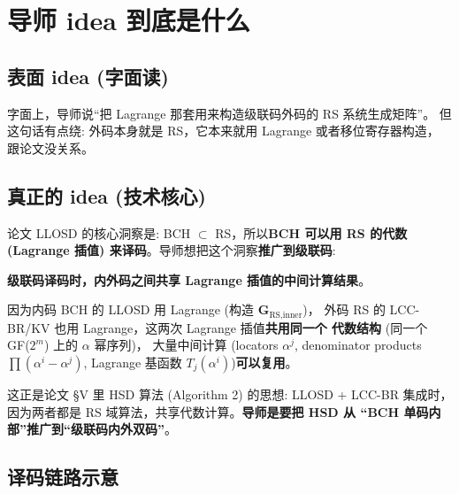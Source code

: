 \documentclass[11pt,a4paper]{article}
\begin{document}
\section{导师 idea 到底是什么}

\subsection{表面 idea (字面读)}

字面上，导师说``把 Lagrange 那套用来构造级联码外码的 RS 系统生成矩阵''。
但这句话有点绕: 外码本身就是 RS，它本来就用 Lagrange 或者移位寄存器构造，
跟论文没关系。

\subsection{真正的 idea (技术核心)}

论文 LLOSD 的核心洞察是: BCH $\subset$ RS，所以\textbf{BCH 可以用 RS 的代数
(Lagrange 插值) 来译码}。导师想把这个洞察\textbf{推广到级联码}:

\begin{keybox}[title=\textbf{核心创新点}]
\textbf{级联码译码时，内外码之间共享 Lagrange 插值的中间计算结果}。

因为内码 BCH 的 LLOSD 用 Lagrange (构造 $\mathbf{G}_{\text{RS,inner}}$)，
外码 RS 的 LCC-BR/KV 也用 Lagrange，这两次 Lagrange 插值\textbf{共用同一个
代数结构} (同一个 GF($2^m$) 上的 $\alpha$ 幂序列)，
大量中间计算 (locators $\alpha^j$, denominator products $\prod(\alpha^i - \alpha^j)$,
Lagrange 基函数 $T_j(\alpha^i)$)\textbf{可以复用}。
\end{keybox}

这正是论文 §V 里 HSD 算法 (Algorithm 2) 的思想: LLOSD + LCC-BR 集成时，
因为两者都是 RS 域算法，共享代数计算。\textbf{导师是要把 HSD 从
``BCH 单码内部''推广到``级联码内外双码''}。

\subsection{译码链路示意}
\end{document}
